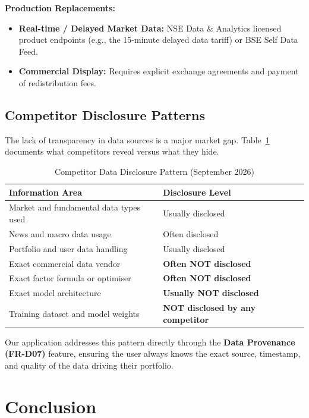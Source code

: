 \documentclass[12pt, a4paper, openany, oneside]{report}
\begin{document}
\textbf{Production Replacements:}
\begin{itemize}
    \item \textbf{Real-time / Delayed Market Data:} NSE Data \& Analytics licensed product endpoints (e.g., the 15-minute delayed data tariff) or BSE Self Data Feed.
    \item \textbf{Commercial Display:} Requires explicit exchange agreements and payment of redistribution fees.
\end{itemize}

\section{Competitor Disclosure Patterns}

The lack of transparency in data sources is a major market gap. Table~\ref{tab:disclosure} documents what competitors reveal versus what they hide.

\begin{table}[H]
\centering
\caption{Competitor Data Disclosure Pattern (September 2026)}
\label{tab:disclosure}
\begin{tabularx}{\textwidth}{|X|l|}
\hline
\textbf{Information Area} & \textbf{Disclosure Level} \\
\hline
Market and fundamental data types used & Usually disclosed \\
News and macro data usage & Often disclosed \\
Portfolio and user data handling & Usually disclosed \\
Exact commercial data vendor & \textbf{Often NOT disclosed} \\
Exact factor formula or optimiser & \textbf{Often NOT disclosed} \\
Exact model architecture & \textbf{Usually NOT disclosed} \\
Training dataset and model weights & \textbf{NOT disclosed by any competitor} \\
\hline
\end{tabularx}
\end{table}

Our application addresses this pattern directly through the \textbf{Data Provenance (FR-D07)} feature, ensuring the user always knows the exact source, timestamp, and quality of the data driving their portfolio.

\chapter*{Conclusion}
\end{document}
